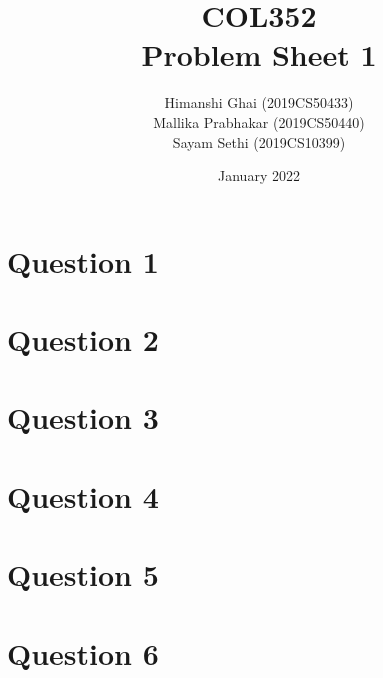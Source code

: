 \documentclass[11pt]{article}
\title{COL352\\Problem Sheet 1}
\author{Himanshi Ghai (2019CS50433)\\Mallika Prabhakar (2019CS50440)\\Sayam Sethi (2019CS10399)}
\date{January 2022}
\begin{document}
\maketitle

\tableofcontents


\newpage
\section{Question 1}



\newpage
\section{Question 2}



\newpage
\section{Question 3}



\newpage
\section{Question 4}



\newpage
\section{Question 5}



\newpage
\section{Question 6}


\end{document}
